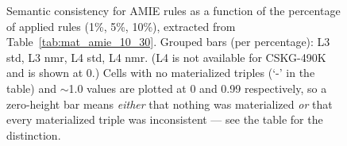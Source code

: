 \documentclass[a4paper,UKenglish,cleveref, autoref, thm-restate]{tgdk-v2021}
\begin{document}
\begin{figure}[t]
\caption{Semantic consistency for AMIE rules as a function of the percentage of applied rules (1\%, 5\%, 10\%), extracted from Table~\ref{tab:mat_amie_10_30}. Grouped bars (per percentage): L3 std, L3 nmr, L4 std, L4 nmr. (L4 is not available for CSKG-490K and is shown at 0.) Cells with no materialized triples (`-' in the table) and $\sim$1.0 values are plotted at 0 and 0.99 respectively, so a zero-height bar means \emph{either} that nothing was materialized \emph{or} that every materialized triple was inconsistent --- see the table for the distinction.}
\label{fig:amie_inc_trend}
\end{figure}

\end{document}
